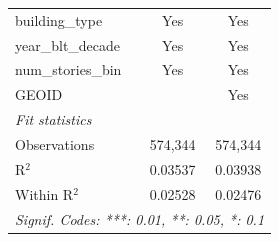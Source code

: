 \begin{tabular}{lcc}
   building\_type          & Yes            & Yes\\  
   year\_blt\_decade       & Yes            & Yes\\  
   num\_stories\_bin       & Yes            & Yes\\  
   GEOID                   &                & Yes\\  
   \midrule
   \emph{Fit statistics}\\
   Observations            & 574,344        & 574,344\\  
   R$^2$                   & 0.03537        & 0.03938\\  
   Within R$^2$            & 0.02528        & 0.02476\\  
   \midrule \midrule
   \multicolumn{3}{l}{\emph{Signif. Codes: ***: 0.01, **: 0.05, *: 0.1}}\\
\end{tabular}
\par\endgroup
\begingroup
\centering
